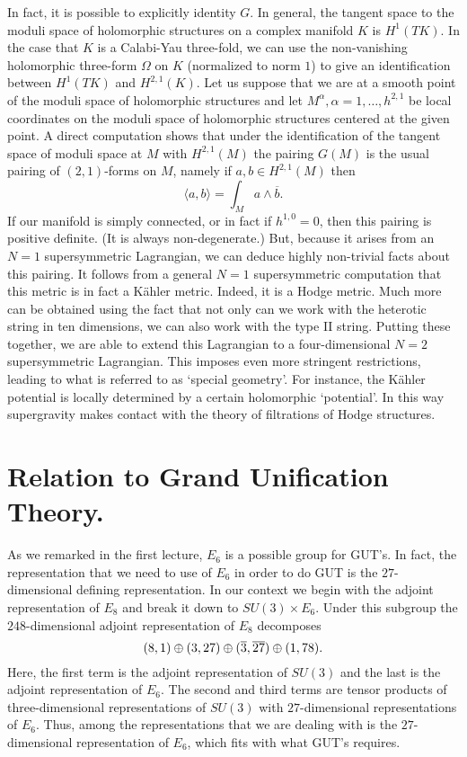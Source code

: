 In fact, it is possible to explicitly identity $G$.
In general, the tangent space to the moduli space of holomorphic
structures on a complex manifold $K$ is $H^1(TK)$. In the case that
$K$ is a Calabi-Yau three-fold, we can use the non-vanishing
holomorphic three-form $\Omega$ on $K$ (normalized to norm $1$) to give
an identification between $H^1(TK)$ and $H^{2,1}(K)$.
Let us suppose that we are at a smooth point of the moduli space of
holomorphic structures and let $M^\alpha, \alpha=1,\ldots,h^{2,1}$
be local coordinates on the moduli space of holomorphic structures
centered at the given point.
A direct computation shows that
under the identification of the tangent space of moduli space at $M$ with
$H^{2,1}(M)$ the pairing
$G(M)$ is the usual pairing of $(2,1)$-forms on $M$, namely
if $a,b\in H^{2,1}(M)$ then
$$\langle a,b\rangle=\int_Ma\wedge
\overline{b} .$$ 
If our manifold is simply connected, or in fact if $h^{1,0}=0$, then
this pairing is positive definite. (It is always non-degenerate.)
But, because it arises from an $N=1$ supersymmetric Lagrangian, we can
deduce highly non-trivial facts about this pairing.
It follows from a general $N=1$
supersymmetric  computation that this metric is in fact a K\"ahler
metric. 
Indeed, it is a Hodge metric.  Much more can be obtained using the
fact that not only can we work with the heterotic string in ten
dimensions, we can also work with the type II string. Putting these
together, we are able to extend this Lagrangian to a four-dimensional
$N=2$ supersymmetric Lagrangian.  This imposes even more stringent
restrictions, leading to what is referred to as `special
geometry'. For instance, the K\"ahler potential is locally 
determined by a certain holomorphic `potential'. In this way
supergravity makes contact with the theory of filtrations of Hodge
structures. 


\section{Relation to Grand Unification Theory.}

As we remarked in the first lecture, $E_6$ is a possible group for
GUT's.  In fact, the representation that we need to use of $E_6$ in
order to do GUT is the $27$-dimensional defining representation.  In
our context we begin with the adjoint representation of $E_8$ and
break it down to $SU(3)\times E_6$. Under this subgroup the
$248$-dimensional adjoint representation of $E_8$ decomposes
$$(8,1)\oplus (3,27)\oplus (\overline{3},\overline{27})\oplus (1,78).$$
Here, the first term is the adjoint representation of $SU(3)$ and the
last is the adjoint representation of $E_6$.  The second and third
terms are
tensor products of  three-dimensional representations of $SU(3)$ with
$27$-dimensional representations of $E_6$.  Thus, among the
representations that we are dealing with is the $27$-dimensional
representation of $E_6$, which fits with what GUT's requires.


